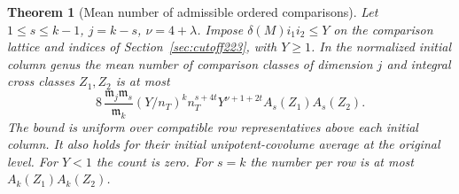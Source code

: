 \documentclass[a4paper,11pt]{article}
\newtheorem{theorem}[proposition]{Theorem}
\theoremstyle{definition}
\theoremstyle{remark}
\numberwithin{equation}{section}
\begin{document}
\begin{theorem}[Mean number of admissible ordered comparisons]
\label{thm:pairmean225}
Let \(1\le s\le k-1\), \(j=k-s\), \(\nu=4+\lambda\).
Impose \(\delta(M)i_1i_2\le Y\) on the comparison lattice
and indices of Section~\ref{sec:cutoff223}, with \(Y\ge1\).
In the normalized initial column genus the mean number of
comparison classes of dimension \(j\) and integral cross
classes \(Z_1,Z_2\) is at most
\begin{equation}
  8\,\frac{\mathfrak m_j\mathfrak m_s}{\mathfrak m_k}
       (Y/n_T)^k n_T^{s+4t} Y^{\nu+1+2t}
                    A_s(Z_1)A_s(Z_2).
                    \label{eq:pairmean225}
\end{equation}
The bound is uniform over compatible row representatives
above each initial column. It also holds for their initial
unipotent-covolume average at the original level. For
\(Y<1\) the count is zero. For \(s=k\) the number per row
is at most \(A_k(Z_1)A_k(Z_2)\).
\end{theorem}
\end{document}
